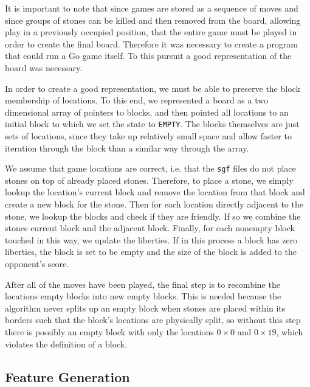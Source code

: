 \documentclass[11pt,letterpaper]{article}
\begin{document}
It is important to note that since games are stored as a sequence of moves and since groups of stones can be
killed and then removed from the board, allowing play in a previously occupied position, that the entire game must be
played in order to create the final board. Therefore it was necessary to create a program that could run a Go game
itself. To this pursuit a good representation of the board was necessary.

In order to create a good representation, we must be able to preserve the block membership of locations. To this
end, we represented a board as a two dimensional array of pointers to blocks, and then pointed all locations to
an initial block to which we set the state to {\tt EMPTY}. The blocks themselves are just sets of locations, since
they take up relatively small space and allow faster to iteration through the block than a similar way through the
array.

We assume that game locations are correct, i.e. that the {\tt sgf} files do not place stones on top of already placed
stones. Therefore, to place a stone, we simply lookup the location's current block and remove the location from
that block and create a new block for the stone. Then for each location directly adjacent to the stone, we lookup the
blocks and check if they are friendly. If so we combine the stones current block and the adjacent block. Finally, for
each nonempty block touched in this way, we update the liberties. If in this process a block has zero liberties, the
block is set to be empty and the size of the block is added to the opponent's score.

After all of the moves have been played, the final step is to recombine the locations empty blocks into new empty
blocks. This is needed because the algorithm never splits up an empty block when stones are placed within its
borders such that the block's locations are physically split, so without this step there is possibly an empty block with
only the locations $0 \times 0$ and $0 \times 19$, which violates the definition of a block.

\subsection{Feature Generation}
\end{document}

